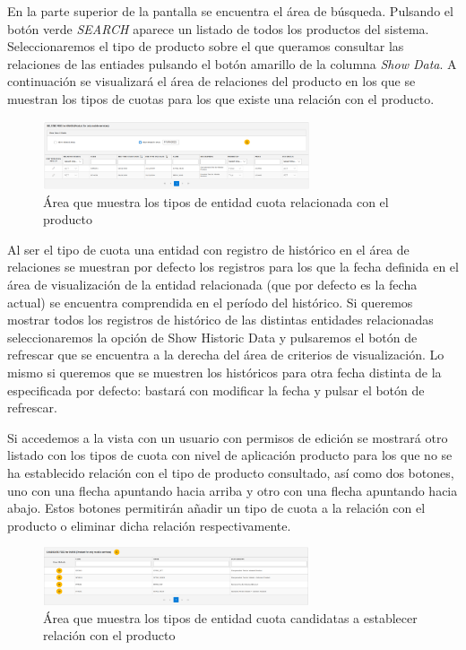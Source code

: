 En la parte superior de la pantalla se encuentra el área de búsqueda. Pulsando el botón verde \emph{SEARCH} aparece un listado de todos los productos del sistema. Seleccionaremos el tipo de producto sobre el que queramos consultar las relaciones de las entiades pulsando el botón amarillo de la columna \emph{Show Data}. A continuación se visualizará el área de relaciones del producto en los que se muestran los tipos de cuotas para los que existe una relación con el producto.


\begin{figure}[H]
  \centering
  \includegraphics[width=0.70\textwidth]{imaxes/area-relacion-tipos-entidades.png}
  \caption{Área que muestra los tipos de entidad cuota relacionada con el producto}
  \label{fig:area-relacion-tipos-entidades}
\end{figure}



Al ser el tipo de cuota una entidad con registro de histórico en el área de relaciones se muestran por defecto los registros para los que la fecha definida en el área de visualización de la entidad relacionada (que por defecto es la fecha actual) se encuentra comprendida en el período del histórico. Si queremos mostrar todos los registros de histórico de las distintas entidades relacionadas seleccionaremos la opción de Show Historic Data y pulsaremos el botón de refrescar que se encuentra a la derecha del área de criterios de visualización. Lo mismo si queremos que se muestren los históricos para otra fecha distinta de la especificada por defecto: bastará con modificar la fecha y pulsar el botón de refrescar.

Si accedemos a la vista con un usuario con permisos de edición se mostrará otro listado con los tipos de cuota con nivel de aplicación producto para los que no se ha establecido relación con el tipo de producto consultado, así como dos botones, uno con una flecha apuntando hacia arriba y otro con una flecha apuntando hacia abajo. Estos botones permitirán añadir un tipo de cuota a la relación con el producto o eliminar dicha relación respectivamente. 



\begin{figure}[H]
  \centering
  \includegraphics[width=0.70\textwidth]{imaxes/area-tipos-entidades-candidatas.png}
  \caption{Área que muestra los tipos de entidad cuota candidatas a establecer relación con el producto}
  \label{fig:area-tipos-entidades-candidatas}
\end{figure}



